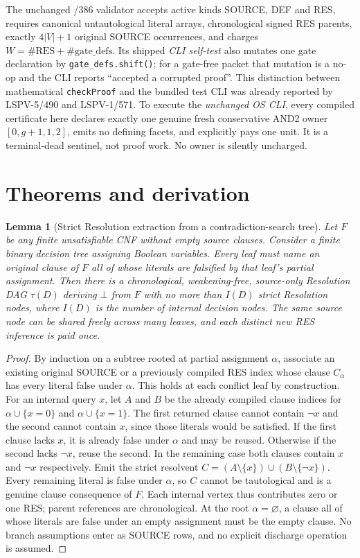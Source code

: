 \documentclass[11pt]{article}
\newtheorem{lemma}[theorem]{Lemma}
\begin{document}
The unchanged /386 validator accepts active kinds SOURCE, DEF and RES, requires canonical untautological literal arrays, chronological signed RES parents, exactly $4|V|+1$ original SOURCE occurrences, and charges $W=\#\mathrm{RES}+\#\mathrm{gate\_defs}$. Its shipped \emph{CLI self-test} also mutates one gate declaration by \texttt{gate\_defs.shift()}; for a gate-free packet that mutation is a no-op and the CLI reports ``accepted a corrupted proof''. This distinction between mathematical \texttt{checkProof} and the bundled test CLI was already reported by LSPV-5/490 and LSPV-1/571. To execute the \emph{unchanged OS CLI}, every compiled certificate here declares exactly one genuine fresh conservative AND2 owner $[0,g+1,1,2]$, emits no defining facets, and explicitly pays one unit. It is a terminal-dead sentinel, not proof work. No owner is silently uncharged.

\section*{Theorems and derivation}
\begin{lemma}[Strict Resolution extraction from a contradiction-search tree]
Let $F$ be any finite unsatisfiable CNF without empty source clauses. Consider a finite binary decision tree assigning Boolean variables. Every leaf must name an \emph{original clause of $F$} all of whose literals are falsified by that leaf's partial assignment. Then there is a chronological, weakening-free, source-only Resolution DAG $\tau(D)$ deriving $\bot$ from $F$ with no more than $I(D)$ strict Resolution nodes, where $I(D)$ is the number of internal decision nodes. The same source node can be shared freely across many leaves, and each distinct new RES inference is paid once.
\end{lemma}
\begin{proof}
By induction on a subtree rooted at partial assignment $\alpha$, associate an existing original SOURCE or a previously compiled RES index whose clause $C_\alpha$ has every literal false under $\alpha$. This holds at each conflict leaf by construction. For an internal query $x$, let $A$ and $B$ be the already compiled clause indices for $\alpha\cup\{x=0\}$ and $\alpha\cup\{x=1\}$. The first returned clause cannot contain $\neg x$ and the second cannot contain $x$, since those literals would be satisfied. If the first clause lacks $x$, it is already false under $\alpha$ and may be reused. Otherwise if the second lacks $\neg x$, reuse the second. In the remaining case both clauses contain $x$ and $\neg x$ respectively. Emit the strict resolvent $C=(A\setminus\{x\})\cup(B\setminus\{\neg x\})$. Every remaining literal is false under $\alpha$, so $C$ cannot be tautological and is a genuine clause consequence of $F$. Each internal vertex thus contributes zero or one RES; parent references are chronological. At the root $\alpha=\varnothing$, a clause all of whose literals are false under an empty assignment must be the empty clause. No branch assumptions enter as SOURCE rows, and no explicit discharge operation is assumed.
\end{proof}
\end{document}
